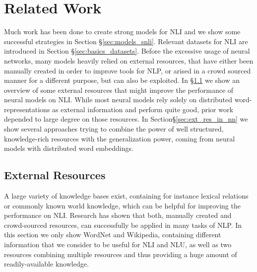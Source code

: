\section{Related Work}\label{sec:related_work}
Much work has been done to create strong models for \ac{NLI} and we show some successful strategies in Section §\ref{sec:models_snli}. Relevant datasets for \ac{NLI} are introduced in Section §\ref{sec:basics_datasets}. Before the excessive usage of neural networks, many models heavily relied on external resources, that have either been manually created in order to improve tools for \ac{NLP}, or arised in a crowd sourced manner for a different purpose, but can also be exploited. In §\ref{sec:ext_resources} we show an overview of some external resources that might improve the performance of neural models on \ac{NLI}. While most neural models rely solely on distributed word-representations as external information and perform quite good, prior work \citep{bos2005recognising,tatu2005semantic} depended to large degree on those resources. In Section§\ref{sec:ext_res_in_nn} we show several approaches trying to combine the power of well structured, knowledge-rich resources with the generalization power, coming from neural models with distributed word embeddings.
\subsection{External Resources}\label{sec:ext_resources}
A large variety of knowledge bases exist, containing for instance lexical relations or commonly known world knowledge, which can be helpful for improving the performance on \ac{NLI}. Research has shown that both, manually created and crowd-sourced resources, can successfully be applied in many tasks of \ac{NLP}. In this section we only show WordNet and Wikipedia, containing different information that we consider to be useful for \ac{NLI} and \ac{NLU}, as well as two resources combining multiple resources and thus providing a huge amount of readily-available knowledge.

